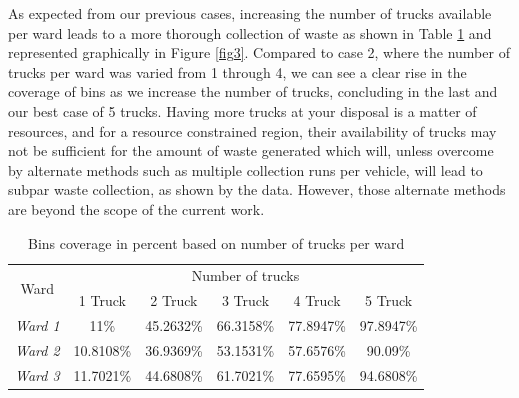 \documentclass[12pt]{article}
\begin{document}
As expected from our previous cases, increasing the number of trucks available per ward leads to a more thorough collection of waste as shown in Table \ref{tab4} and represented graphically in Figure \ref{fig3}. Compared to case 2, where the number of trucks per ward was varied from 1 through 4, we can see a clear rise in the coverage of bins as we increase the number of trucks, concluding in the last and our best case of 5 trucks. Having more trucks at your disposal is a matter of resources, and for a resource constrained region, their availability of trucks may not be sufficient for the amount of waste generated which will, unless overcome by alternate methods such as multiple collection runs per vehicle, will lead to subpar waste collection, as shown by the data. However, those alternate methods are beyond the scope of the current work.
\begin{table}[H]
    \centering
    \caption{ Bins coverage in percent based on number of trucks per ward} \label{tab4}
    \vspace*{0.3cm}
    \begin{tabular}{|c|c|c|c|c|c|}
        \hline \multirow{2}{*}{Ward} & \multicolumn{5}{c|}{Number of trucks}\\
        \cline{2-6}& 1 Truck& 2 Truck& 3 Truck& 4 Truck& 5 Truck\\
        \hline \textit{Ward 1} & 11\%& 45.2632\%& 66.3158\%& 77.8947\%& 97.8947\%\\
        \hline \textit{Ward 2} &10.8108\%&36.9369\%&53.1531\%&57.6576\%&90.09\%\\
        \hline \textit{Ward 3} &11.7021\%&44.6808\%&61.7021\%&77.6595\%&94.6808\%\\
        \hline
    \end{tabular}
\end{table}
\end{document}
